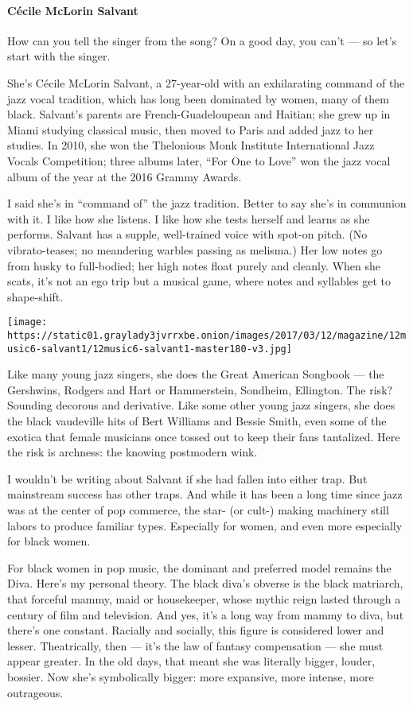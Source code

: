 \hypertarget{cuxe9cile-mclorin-salvant}{%
\paragraph{Cécile McLorin Salvant}\label{cuxe9cile-mclorin-salvant}}

How can you tell the singer from the song? On a good day, you can't ---
so let's start with the singer.

She's Cécile McLorin Salvant, a 27-year-old with an exhilarating command
of the jazz vocal tradition, which has long been dominated by women,
many of them black. Salvant's parents are French-Guadeloupean and
Haitian; she grew up in Miami studying classical music, then moved to
Paris and added jazz to her studies. In 2010, she won the Thelonious
Monk Institute International Jazz Vocals Competition; three albums
later, ``For One to Love'' won the jazz vocal album of the year at the
2016 Grammy Awards.

I said she's in ``command of'' the jazz tradition. Better to say she's
in communion with it. I like how she listens. I like how she tests
herself and learns as she performs. Salvant has a supple, well-trained
voice with spot-on pitch. (No vibrato-teases; no meandering warbles
passing as melisma.) Her low notes go from husky to full-bodied; her
high notes float purely and cleanly. When she scats, it's not an ego
trip but a musical game, where notes and syllables get to shape-shift.

\texttt{[image: https://static01.graylady3jvrrxbe.onion/images/2017/03/12/magazine/12music6-salvant1/12music6-salvant1-master180-v3.jpg]}

Like many young jazz singers, she does the Great American Songbook ---
the Gershwins, Rodgers and Hart or Hammerstein, Sondheim, Ellington. The
risk? Sounding decorous and derivative. Like some other young jazz
singers, she does the black vaudeville hits of Bert Williams and Bessie
Smith, even some of the exotica that female musicians once tossed out to
keep their fans tantalized. Here the risk is archness: the knowing
postmodern wink.

I wouldn't be writing about Salvant if she had fallen into either trap.
But mainstream success has other traps. And while it has been a long
time since jazz was at the center of pop commerce, the star- (or cult-)
making machinery still labors to produce familiar types. Especially for
women, and even more especially for black women.

For black women in pop music, the dominant and preferred model remains
the Diva. Here's my personal theory. The black diva's obverse is the
black matriarch, that forceful mammy, maid or housekeeper, whose mythic
reign lasted through a century of film and television. And yes, it's a
long way from mammy to diva, but there's one constant. Racially and
socially, this figure is considered lower and lesser. Theatrically, then
--- it's the law of fantasy compensation --- she must appear greater. In
the old days, that meant she was literally bigger, louder, bossier. Now
she's symbolically bigger: more expansive, more intense, more
outrageous.

